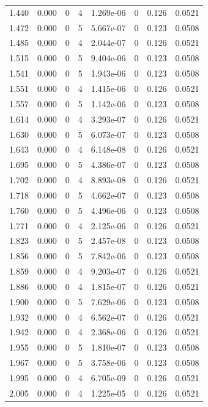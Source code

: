 \documentclass[preview]{standalone}
\begin{document}
{{{\begin{tabular}{L{1.2cm}C{1.2cm} C{0.3cm}C{0.5cm} C{1.4cm}C{1.4cm} C{1.4cm}C{1.4cm}}
  1.440  &  0.000  & 0     &  4 &  1.269e-06  & 0  & 0.126 &  0.0521   \\ 
  1.472  &  0.000  & 0     &  5 &  5.667e-07  & 0  & 0.123 &  0.0508   \\ 
  1.485  &  0.000  & 0     &  4 &  2.044e-07  & 0  & 0.126 &  0.0521   \\ 
  1.515  &  0.000  & 0     &  5 &  9.404e-06  & 0  & 0.123 &  0.0508   \\ 
  1.541  &  0.000  & 0     &  5 &  1.943e-06  & 0  & 0.123 &  0.0508   \\ 
  1.551  &  0.000  & 0     &  4 &  1.415e-06  & 0  & 0.126 &  0.0521   \\ 
  1.557  &  0.000  & 0     &  5 &  1.142e-06  & 0  & 0.123 &  0.0508   \\ 
  1.614  &  0.000  & 0     &  4 &  3.293e-07  & 0  & 0.126 &  0.0521   \\ 
  1.630  &  0.000  & 0     &  5 &  6.073e-07  & 0  & 0.123 &  0.0508   \\ 
  1.643  &  0.000  & 0     &  4 &  6.148e-08  & 0  & 0.126 &  0.0521   \\ 
  1.695  &  0.000  & 0     &  5 &  4.386e-07  & 0  & 0.123 &  0.0508   \\ 
  1.702  &  0.000  & 0     &  4 &  8.893e-08  & 0  & 0.126 &  0.0521   \\ 
  1.718  &  0.000  & 0     &  5 &  4.662e-07  & 0  & 0.123 &  0.0508   \\ 
  1.760  &  0.000  & 0     &  5 &  4.496e-06  & 0  & 0.123 &  0.0508   \\ 
  1.771  &  0.000  & 0     &  4 &  2.125e-06  & 0  & 0.126 &  0.0521   \\ 
  1.823  &  0.000  & 0     &  5 &  2.457e-08  & 0  & 0.123 &  0.0508   \\ 
  1.856  &  0.000  & 0     &  5 &  7.842e-06  & 0  & 0.123 &  0.0508   \\ 
  1.859  &  0.000  & 0     &  4 &  9.203e-07  & 0  & 0.126 &  0.0521   \\ 
  1.886  &  0.000  & 0     &  4 &  1.815e-07  & 0  & 0.126 &  0.0521   \\ 
  1.900  &  0.000  & 0     &  5 &  7.629e-06  & 0  & 0.123 &  0.0508   \\ 
  1.932  &  0.000  & 0     &  4 &  6.562e-07  & 0  & 0.126 &  0.0521   \\ 
  1.942  &  0.000  & 0     &  4 &  2.368e-06  & 0  & 0.126 &  0.0521   \\ 
  1.955  &  0.000  & 0     &  5 &  1.810e-07  & 0  & 0.123 &  0.0508   \\ 
  1.967  &  0.000  & 0     &  5 &  3.758e-06  & 0  & 0.123 &  0.0508   \\ 
  1.995  &  0.000  & 0     &  4 &  6.705e-09  & 0  & 0.126 &  0.0521   \\ 
  2.005  &  0.000  & 0     &  4 &  1.225e-05  & 0  & 0.126 &  0.0521   \\ 
\hline 
\end{tabular} 

}}}
\end{document}
